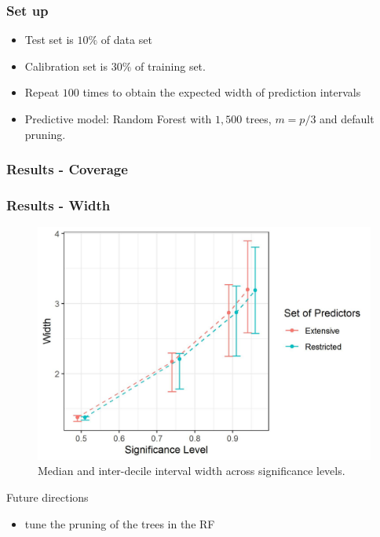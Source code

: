 \documentclass{beamer}
\begin{document}
\begin{frame} \frametitle{Set up}
\begin{itemize}
	\item Test set is $10\%$ of data set
	\item Calibration set is $30\%$ of training set.
	\item Repeat $100$ times to obtain the expected width of prediction intervals	
	\item Predictive model: Random Forest with $1,500$ trees, $m = p/3$ and default pruning.
\end{itemize}
\end{frame}

\begin{frame} \frametitle{Results - Coverage}  

\end{frame}

\begin{frame} \frametitle{Results - Width}   
\begin{figure}
	\centering
	\includegraphics[scale = 0.5]{conformal.jpeg}
	\caption{Median and inter-decile interval width across significance levels.}
	\label{fig:conformal}
\end{figure}
\end{frame}

\begin{frame}
Future directions
\begin{itemize}
	\item tune the pruning of the trees in the RF
\end{itemize}
\end{frame}
\end{document}
